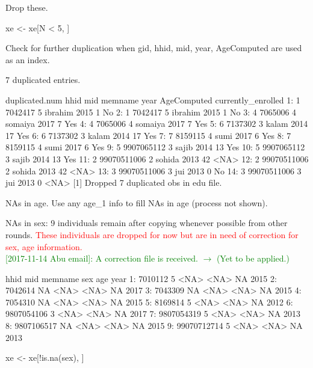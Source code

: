 Drop these.
\begin{Schunk}
\begin{Sinput}
xe <- xe[N < 5, ]
\end{Sinput}
\end{Schunk}
Check for further duplication when \textsf{gid, hhid, mid, year, AgeComputed} are used as an index.
\begin{Schunk}
\begin{Soutput}
[1] 7 duplicated entries.
\end{Soutput}
\begin{Soutput}
    duplicated.num        hhid mid memname year AgeComputed currently_enrolled
 1:              1     7042417   5 ibrahim 2015           1                 No
 2:              1     7042417   5 ibrahim 2015           1                 No
 3:              4     7065006   4 somaiya 2017           7                Yes
 4:              4     7065006   4 somaiya 2017           7                Yes
 5:              6     7137302   3   kalam 2014          17                Yes
 6:              6     7137302   3   kalam 2014          17                Yes
 7:              7     8159115   4    sumi 2017           6                Yes
 8:              7     8159115   4    sumi 2017           6                Yes
 9:              5  9907065112   3   sajib 2014          13                Yes
10:              5  9907065112   3   sajib 2014          13                Yes
11:              2 99070511006   2  sohida 2013          42               <NA>
12:              2 99070511006   2  sohida 2013          42               <NA>
13:              3 99070511006   3     jui 2013           0                 No
14:              3 99070511006   3     jui 2013           0               <NA>
[1] Dropped 7 duplicated obs in edu file.
\end{Soutput}
\end{Schunk}
NAs in \textsf{age}. Use any \textsf{age\_1} info to fill NAs in age (process not shown).


NAs in \textsf{sex}: 9 individuals remain after copying whenever possible from other rounds. \textcolor{red}{These individuals are dropped for now but are in need of correction for sex, age information.} \\
\textcolor{green}{[2017-11-14 Abu email]: A correction file is received. $\rightarrow$ (Yet to be applied.)}
\gobblepars
\begin{Schunk}
\begin{Soutput}
          hhid mid memname  sex age year
1:     7010112   5    <NA> <NA>  NA 2015
2:     7042614  NA    <NA> <NA>  NA 2017
3:     7043309  NA    <NA> <NA>  NA 2015
4:     7054310  NA    <NA> <NA>  NA 2015
5:     8169814   5    <NA> <NA>  NA 2012
6:  9807054106   3    <NA> <NA>  NA 2017
7:  9807054319   5    <NA> <NA>  NA 2013
8:  9807106517  NA    <NA> <NA>  NA 2015
9: 99070712714   5    <NA> <NA>  NA 2013
\end{Soutput}
\end{Schunk}
\begin{Schunk}
\begin{Sinput}
xe <- xe[!is.na(sex), ]
\end{Sinput}
\end{Schunk}


